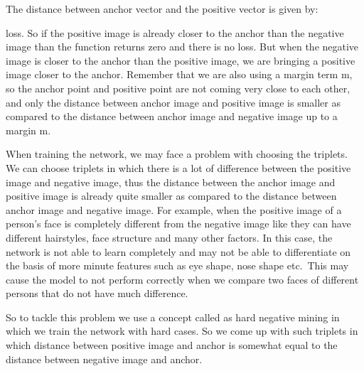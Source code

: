 The distance between anchor vector and the positive vector is given by:




loss. So if the positive image is already closer to the anchor than the negative
image than the function returns zero and there is no loss. But when the negative
image is closer to the anchor than the positive image, we are bringing a
positive image closer to the anchor. Remember that we are also using a margin
term m, so the anchor point and positive point are not coming very close to each
other, and only the distance between anchor image and positive image is smaller
as compared to the distance between anchor image and negative image up to a
margin m.

When training the network, we may face a problem with choosing the triplets. We
can choose triplets in which there is a lot of difference between the positive
image and negative image, thus the distance between the anchor image and
positive image is already quite smaller as compared to the distance between
anchor image and negative image. For example, when the positive image of a
person's face is completely different from the negative image like they can have
different hairstyles, face structure and many other factors. In this case, the
network is not able to learn completely and may not be able to differentiate on
the basis of more minute features such as eye shape, nose shape etc.\ This may
cause the model to not perform correctly when we compare two faces of different
persons that do not have much difference.

So to tackle this problem we use a concept called as hard negative mining in
which we train the network with hard cases. So we come up with such triplets in
which distance between positive image and anchor is somewhat equal to the
distance between negative image and anchor.
